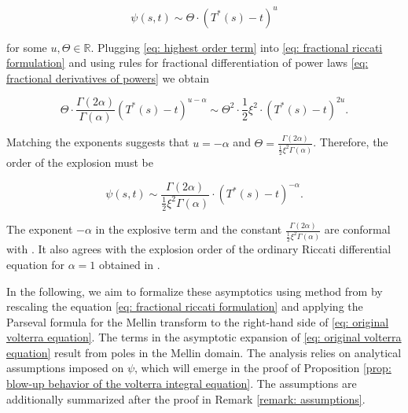 \documentclass[12pt,twoside]{article}
\theoremstyle{plain}
\theoremstyle{plain}
\theoremstyle{definition}
\theoremstyle{remark}
\numberwithin{equation}{section}
\begin{document}
\begin{equation}
\label{eq: highest order term}
\psi(s,t) \sim \Theta \cdot (T^*(s)-t)^u
\end{equation}

for some $u, \Theta\in \mathbb R$. Plugging \eqref{eq: highest order term} into \eqref{eq: fractional riccati formulation} and using rules for fractional differentiation of power laws \eqref{eq: fractional derivatives of powers} we obtain

$$
\Theta \cdot \frac{\Gamma(2\alpha)}{\Gamma(\alpha)} (T^*(s)-t)^{u-\alpha} \sim \Theta^2 \cdot \frac 12 \xi ^ 2\cdot (T^*(s)-t)^{2u}.
$$

Matching the exponents suggests that $u = -\alpha$ and $\Theta=\frac{\Gamma(2\alpha)}{\frac 12 \xi^2 \Gamma(\alpha)}$. Therefore, the order of the explosion must be

$$
\psi(s,t) \sim \frac{\Gamma(2\alpha)}{\frac 12 \xi^2\Gamma(\alpha)} \cdot (T^*(s)-t)^{-\alpha}.
$$

The exponent $-\alpha$ in the explosive term and the constant $\frac{\Gamma(2\alpha)}{\frac 12 \xi^2 \Gamma(\alpha)}$ are conformal with \cite{RO96}. It also agrees with the explosion order of the ordinary Riccati differential equation for $\alpha=1$ obtained in \cite{FGGS10}.

In the following, we aim to formalize these asymptotics using method from \cite{RO96} by rescaling the equation \eqref{eq: fractional riccati formulation} and applying the Parseval formula for the Mellin transform to the right-hand side of \eqref{eq: original volterra equation}.  The terms in the asymptotic expansion of \eqref{eq: original volterra equation} result from poles in the Mellin domain. The analysis relies on analytical assumptions imposed on $\psi$, which will emerge in the proof of Proposition \ref{prop: blow-up behavior of the volterra integral equation}. The assumptions are additionally summarized after the proof in Remark \ref{remark: assumptions}.

\vspace{10pt}
\end{document}
